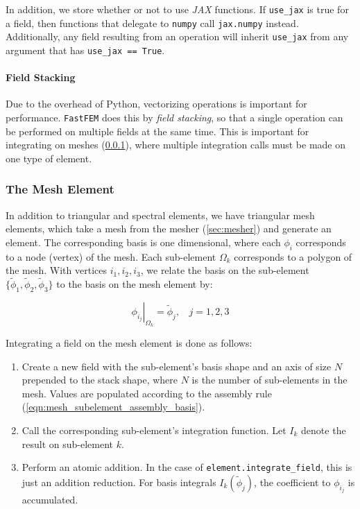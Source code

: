 In addition, we store whether or not to use \emph{JAX} functions. If \verb+use_jax+ is true for a field, then functions that delegate to \verb+numpy+ call \verb+jax.numpy+ instead. Additionally, any field resulting from an operation will inherit \verb+use_jax+ from any argument that has \verb+use_jax == True+.

\paragraph{Field Stacking}

Due to the overhead of Python, vectorizing operations is important for performance. \texttt{FastFEM} does this by \emph{field stacking}, so that a single operation can be performed on multiple fields at the same time. This is important for integrating on meshes (\ref{sec:elem_field:mesh_element}), where multiple integration calls must be made on one type of element.

\subsubsection{The Mesh Element} \label{sec:elem_field:mesh_element}

In addition to triangular and spectral elements, we have triangular mesh elements, which take a mesh from the mesher (\ref{sec:mesher}) and generate an element. The corresponding basis is one dimensional, where each $\phi_i$ corresponds to a node (vertex) of the mesh. Each sub-element $\Omega_k$ corresponds to a polygon of the mesh. With vertices $i_1,i_2,i_3$, we relate the basis on the sub-element $\{\tilde\phi_1,\tilde\phi_2,\tilde\phi_3\}$ to the basis on the mesh element by:

\begin{equation}
    \left.\phi_{i_j}\right|_{\Omega_k} = \tilde\phi_j,~~~~j=1,2,3
    \label{eqn:mesh_subelement_assembly_basis}
\end{equation}

Integrating a field on the mesh element is done as follows:
\begin{enumerate}
\item Create a new field with the sub-element's basis shape and an axis of size $N$ prepended to the stack shape, where $N$ is the number of sub-elements in the mesh. Values are populated according to the assembly rule (\ref{eqn:mesh_subelement_assembly_basis}).
\item Call the corresponding sub-element's integration function. Let $I_k$ denote the result on sub-element $k$.
\item Perform an atomic addition. In the case of \verb+element.integrate_field+, this is just an addition reduction. For basis integrals $I_k(\tilde\phi_j)$, the coefficient to $\phi_{i_j}$ is accumulated.
\end{enumerate}

